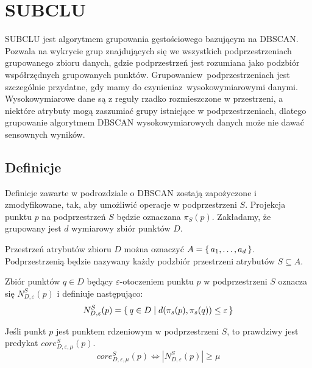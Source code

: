 \section{SUBCLU}

SUBCLU \cite{subclu} jest algorytmem grupowania gęstościowego bazującym na \linebreak DBSCAN. Pozwala na wykrycie grup znajdujących się we wszystkich podprzestrzeniach grupowanego zbioru danych, gdzie podprzestrzeń jest rozumiana jako podzbiór współrzędnych grupowanych punktów. Grupowanie\linebreak \mbox{w podprzestrzeniach} jest szczególnie przydatne, gdy mamy do czynienia\linebreak \mbox{z wysokowymiarowymi} danymi. Wysokowymiarowe dane są z reguły rzadko rozmieszczone w przestrzeni, a niektóre atrybuty mogą zaszumiać grupy istniejące w podprzestrzeniach, dlatego grupowanie algorytmem DBSCAN wysokowymiarowych danych może nie dawać sensownych wyników.

\subsection{Definicje}
Definicje zawarte w podrozdziale o DBSCAN zostają zapożyczone i zmodyfikowane, tak, aby umożliwić operacje w podprzestrzeni $ S $. Projekcja punktu $ p $ na podprzestrzeń $ S $ będzie oznaczana $\pi_S(p) $. Zakładamy, że grupowany jest $ d $ wymiarowy zbiór punktów $ D $.
\smallskip

\setcounter{definitioncounter}{0}
\newline
 Przestrzeń atrybutów zbioru $ D $ można oznaczyć $ A=\set{a_1,\dots,a_d} $. Podprzestrzenią będzie nazywany każdy podzbiór przestrzeni atrybutów $ S \subseteq A $.
\smallskip

\newline
Zbiór punktów $ q\in D $ będący $ \varepsilon $-otoczeniem punktu $ p $ w podprzestrzeni $ S $ oznacza się $ N^S_{D,\varepsilon}(p) $ i definiuje następująco:
\begin{equation}
	N^S_{D,\varepsilon}(p) = \set{q \in D | d(\pi_s(p), \pi_s(q)) \le \varepsilon}
\end{equation}

\newline
Jeśli punkt $ p $ jest punktem rdzeniowym w podprzestrzeni $ S $, to prawdziwy jest predykat $ core^S_{D,\varepsilon,\mu}(p) $.
\begin{equation}
	core^S_{D,\varepsilon,\mu}(p) \iff |N^S_{D,\varepsilon}(p)| \ge \mu
\end{equation}

